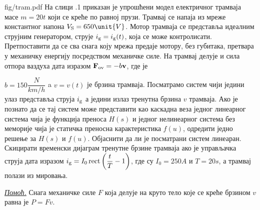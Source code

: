 \begin{slikaDesno}[0.83]{fig/tram.pdf}
    \PID 
На слици \ID.1 приказан је упрошћени модел 
електричног трамваја масе $m = 20\unit{t}$ који
се креће по равној прузи. Трамвај 
се напаја из мреже константног напона $V_{\rm S} = 
650\unit{V}$. Мотор трамваја се представља 
идеалним струјним генератором, струје 
$i_{\rm g} = i_{\rm g}(t)$, која се 
може контролисати. Претпоставити да се сва снага
коју мрежа предаје мотору, без губитака, претвара у механичку 
енергију посредством механичке силе. 
На трамвај делује и сила отпора ваздуха
дата изразом ${\bf F}_{\rm ov} = -b {\bf v}$, где је\linebreak 
\vspace*{-3mm}
\end{slikaDesno} 
$b = 150\unit{\dfrac{N}{km/h}}$ a 
$v = v(t)$ је брзина трамваја.
Посматрамо систем чији једини
улаз представља струја $i_{\rm g}$ а једини
излаз тренутна брзина $v$ трамваја. 
Ако је познато да се тај систем може представити 
као каскадна веза једног линеарног система 
чија је функција преноса $H(s)$ и једног 
нелинеарног система без меморије чија је 
статичка преносна карактеристика $f(u)$,
одредити једно решење за 
$H(s)$ и $f(u)$. Објаснити да ли 
је посматрани систем линеаран.
Скицирати временски дијаграм тренутне брзине 
трамваја ако је управљачка струја дата изразом
$i_{\rm g} = I_0 \operatorname{rect}
\left( \dfrac{t}{T} - 1 \right)$,
где су $I_0 = 250\unit{A}$ и $T = 20\unit{s}$,
а трамвај полази из мировања.
\vspace*{1mm}

\noindent
\textit{\underline{Помоћ.}} Снага механичке силе $F$ која 
делује на круто тело које се креће брзином $v$ 
равна је $P = Fv$. \\

